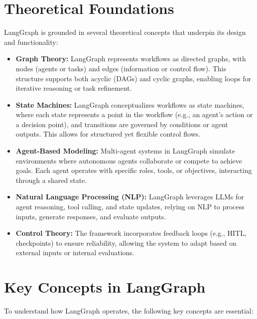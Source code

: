 \documentclass{article}
\begin{document}
\section{Theoretical Foundations}

LangGraph is grounded in several theoretical concepts that underpin its design and functionality:

\begin{itemize}
    \item \textbf{Graph Theory:} LangGraph represents workflows as directed graphs, with nodes (agents or tasks) and edges (information or control flow). This structure supports both acyclic (DAGs) and cyclic graphs, enabling loops for iterative reasoning or task refinement.
    \item \textbf{State Machines:} LangGraph conceptualizes workflows as state machines, where each state represents a point in the workflow (e.g., an agent’s action or a decision point), and transitions are governed by conditions or agent outputs. This allows for structured yet flexible control flows.
    \item \textbf{Agent-Based Modeling:} Multi-agent systems in LangGraph simulate environments where autonomous agents collaborate or compete to achieve goals. Each agent operates with specific roles, tools, or objectives, interacting through a shared state.
    \item \textbf{Natural Language Processing (NLP):} LangGraph leverages LLMs for agent reasoning, tool calling, and state updates, relying on NLP to process inputs, generate responses, and evaluate outputs.
    \item \textbf{Control Theory:} The framework incorporates feedback loops (e.g., HITL, checkpoints) to ensure reliability, allowing the system to adapt based on external inputs or internal evaluations.
\end{itemize}

\section{Key Concepts in LangGraph}

To understand how LangGraph operates, the following key concepts are essential:
\end{document}
